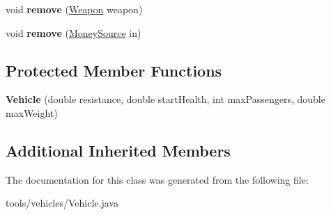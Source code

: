 \begin{DoxyCompactItemize}
\item 
void {\bfseries remove} (\hyperlink{classtools_1_1weapons_1_1_weapon}{Weapon} weapon)\hypertarget{classtools_1_1vehicles_1_1_vehicle_a67c3a4cbca4a9f0cfe5d84318565faf3}{}\label{classtools_1_1vehicles_1_1_vehicle_a67c3a4cbca4a9f0cfe5d84318565faf3}

\item 
void {\bfseries remove} (\hyperlink{classuniverse_1_1_money_source}{Money\+Source} in)\hypertarget{classtools_1_1vehicles_1_1_vehicle_a239449ebb04d8ba54738b3c70e85f7da}{}\label{classtools_1_1vehicles_1_1_vehicle_a239449ebb04d8ba54738b3c70e85f7da}

\end{DoxyCompactItemize}
\subsection*{Protected Member Functions}
\begin{DoxyCompactItemize}
\item 
{\bfseries Vehicle} (double resistance, double start\+Health, int max\+Passengers, double max\+Weight)\hypertarget{classtools_1_1vehicles_1_1_vehicle_a35efafff10524c67359f3a7570a2478b}{}\label{classtools_1_1vehicles_1_1_vehicle_a35efafff10524c67359f3a7570a2478b}

\end{DoxyCompactItemize}
\subsection*{Additional Inherited Members}


The documentation for this class was generated from the following file\+:\begin{DoxyCompactItemize}
\item 
tools/vehicles/Vehicle.\+java\end{DoxyCompactItemize}
